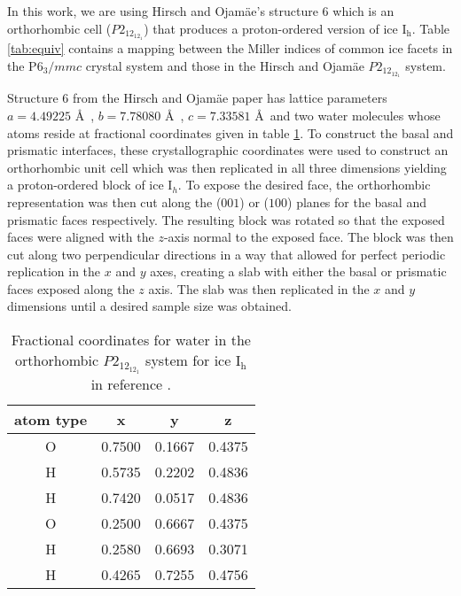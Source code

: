 \documentclass[11pt]{article}
\begin{document}
\begin{doublespace}
In this work, we are using Hirsch and Ojam\"{a}e's structure 6 which
is an orthorhombic cell ($P2_12_12_1$) that produces a proton-ordered
version of ice I$_\mathrm{h}$.  Table \ref{tab:equiv} contains a
mapping between the Miller indices of common ice facets in the
P$6_3/mmc$ crystal system and those in the Hirsch and Ojam\"{a}e
$P2_12_12_1$ system.

Structure 6 from the Hirsch and Ojam\"{a}e paper has lattice
parameters $a = 4.49225$ \AA\ , $b = 7.78080$ \AA\ , $c = 7.33581$ \AA\
and two water molecules whose atoms reside at fractional coordinates
given in table \ref{tab:p212121}. To construct the basal and prismatic
interfaces, these crystallographic coordinates were used to construct
an orthorhombic unit cell which was then replicated in all three
dimensions yielding a proton-ordered block of ice I$_{h}$. To expose
the desired face, the orthorhombic representation was then cut along
the ($001$) or ($100$) planes for the basal and prismatic faces
respectively. The resulting block was rotated so that the exposed
faces were aligned with the $z$-axis normal to the exposed face. The
block was then cut along two perpendicular directions in a way that
allowed for perfect periodic replication in the $x$ and $y$ axes,
creating a slab with either the basal or prismatic faces exposed along
the $z$ axis. The slab was then replicated in the $x$ and $y$
dimensions until a desired sample size was obtained.

\begin{table}[h]
\centering
  \caption{Fractional coordinates for water in the orthorhombic
    $P2_12_12_1$ system for ice I$_\mathrm{h}$ in reference  \protect\citep{Hirsch04}.}
\label{tab:p212121}
\begin{tabular}{|cccc|}  \hline
atom type & x & y & z \\ \hline
 O & 0.7500 & 0.1667 & 0.4375 \\
 H & 0.5735 & 0.2202 & 0.4836 \\
 H & 0.7420 & 0.0517 & 0.4836 \\
 O & 0.2500 & 0.6667 & 0.4375 \\
 H & 0.2580 & 0.6693 & 0.3071 \\
 H & 0.4265 & 0.7255 & 0.4756 \\ \hline
\end{tabular}
\end{table}


\end{doublespace}
\end{document}
